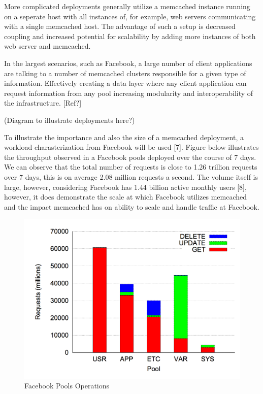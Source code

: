 More complicated deployments generally utilize a memcached instance running on a seperate host with all instances of, for example, web servers communicating with a single memcached host. The advantage of such a setup is decreased coupling and increased potential for scalability by adding more instances of both web server and memcached.

In the largest scenarios, such as Facebook, a large number of client applications are talking to a number of memcached clusters responsible for a given type of information. Effectively creating a data layer where any client application can request information from any pool increasing modularity and interoperability of the infrastructure. [Ref?]

(Diagram to illustrate deployments here?)

To illustrate the importance and also the size of a memcached deployment, a workload charasterization from Facebook will be used [7]. Figure below illustrates the throughput observed in a Facebook pools deployed over the course of 7 days. We can observe that the total number of requests is close to 1.26 trillion requests over 7 days, this is on average 2.08 million requests a second. The volume itself is large, however, considering Facebook has 1.44 billion active monthly users [8], however, it does demonstrate the scale at which Facebook utilizes memcached and the impact memcached has on ability to scale and handle traffic at Facebook.

\begin{figure}[h]
    \includegraphics[width=\textwidth]{./res/5_facebook_pool_ops.png}
    \caption{Facebook Pools Operations}
    \label{fig:facebook-pools}
\end{figure}

